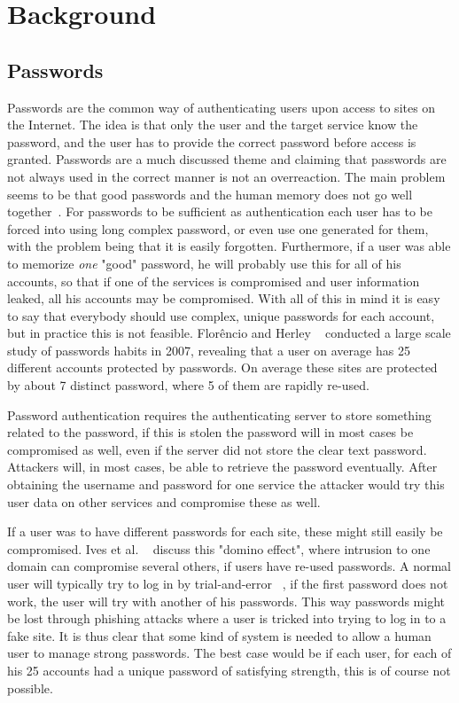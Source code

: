 \chapter{Background}\label{chp:background}


\section{Passwords}
Passwords are the common way of authenticating users upon access to sites on the Internet. The idea is that only the user and the target service know the password, and the user has to provide the correct password before access is granted. Passwords are a much discussed theme and claiming that passwords are not always used in the correct manner is not an overreaction. The main problem seems to be that good passwords and the human memory does not go well together~\cite{memorability_yan}. For passwords to be sufficient as authentication each user has to be forced into using long complex password, or even use one generated for them, with the problem being that it is easily forgotten. Furthermore, if a user was able to memorize \emph{one} "good" password, he will probably use this for all of his accounts, so that if one of the services is compromised and user information leaked, all his accounts may be compromised. With all of this in mind it is easy to say that everybody should use complex, unique passwords for each account, but in practice this is not feasible. Florêncio and Herley ~\cite{password-habits} conducted a large scale study of passwords habits in 2007, revealing that a user on average has 25 different accounts protected by passwords. On average these sites are protected by about 7 distinct password, where 5 of them are rapidly re-used.
\par Password authentication requires the authenticating server to store something related to the password, if this is stolen the password will in most cases be compromised as well, even if the server did not store the clear text password. Attackers will, in most cases, be able to retrieve the password eventually. After obtaining the username and password for one service the attacker would try this user data on other services and compromise these as well. 
\par If a user was to have different passwords for each site, these might still easily be compromised. Ives et al. ~\cite{domino-effect} discuss this "domino effect", where intrusion to one domain can compromise several others, if users have re-used passwords.  A normal user will typically try to log in by trial-and-error ~\cite{single-pw-auth}, if the first password does not work, the user will try with another of his passwords. This way passwords might be lost through phishing attacks where a user is tricked into trying to log in to a fake site. It is thus clear that some kind of system is needed to allow a human user to manage strong passwords. The best case would be if each user, for each of his 25 accounts had a unique password of satisfying strength, this is of course not possible.

